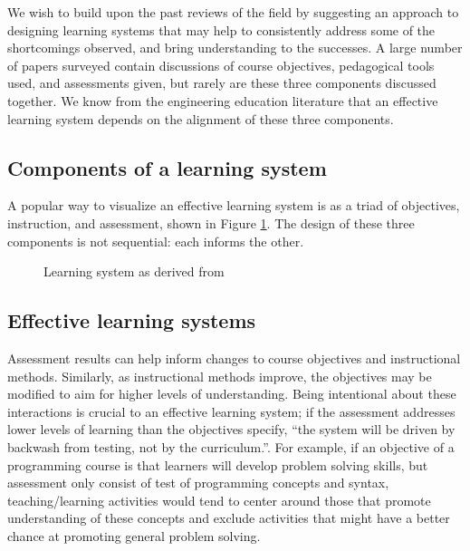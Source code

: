 \documentclass[12pt]{article}
\begin{document}
We wish to build upon the past reviews of the field by suggesting an
approach to designing learning systems that may help to consistently
address some of the shortcomings observed, and bring understanding to
the successes. A large number of papers surveyed contain discussions
of course objectives, pedagogical tools used, and assessments given,
but rarely are these three components discussed together. We know from
the engineering education literature that an effective learning system
depends on the alignment of these three
components\autocite{jamieson_creating_2009,pellegrino_rethinking_2006}.

\subsection{Components of a learning
system}\label{sec:components-of-a-learning-system}
A popular way to visualize an effective learning system is as a triad
of objectives, instruction, and
assessment\autocite{felder_designing_2003}, shown in Figure
\ref{fig:learning-system}. The design of these three components is not
sequential: each informs the other.

\begin{figure}[h!]
  \centering
  \caption{Learning system as derived from
    \citeauthor{felder_designing_2003}\autocite{felder_designing_2003}}
  \label{fig:learning-system}
\end{figure}

\subsection{Effective learning systems}\label{sec:effective-learning-systems}

Assessment results can help inform changes to course objectives and
instructional methods\autocite{felder_designing_2003}. Similarly, as
instructional methods improve, the objectives may be modified to aim
for higher levels of understanding. Being intentional about these
interactions is crucial to an effective learning system; if the
assessment addresses lower levels of learning than the objectives
specify, ``the system will be driven by backwash from testing, not by
the curriculum.''\autocite[][p. 350]{biggs_enhancing_1996}. For
example, if an objective of a programming course is that learners will
develop problem solving skills, but assessment only consist of test of
programming concepts and syntax, teaching/learning activities would
tend to center around those that promote understanding of these
concepts and exclude activities that might have a better chance at
promoting general problem solving\autocite{biggs_enhancing_1996}.
\end{document}
